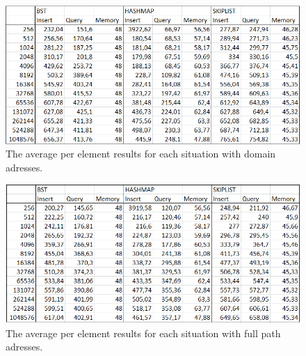 \documentclass[12pt,a4paper]{article}
\begin{document}
    \begin{figure}[h!]
    \centering
    \includegraphics[width=\textwidth]{domain-averages.png}
    \caption{The average per element results for each situation with domain adresses.}
    \end{figure}

    \begin{figure}[h!]
    \centering
    \includegraphics[width=\textwidth]{full-path-averages.png}
    \caption{The average per element results for each situation with full path adresses.}
    \end{figure}
\end{document}
